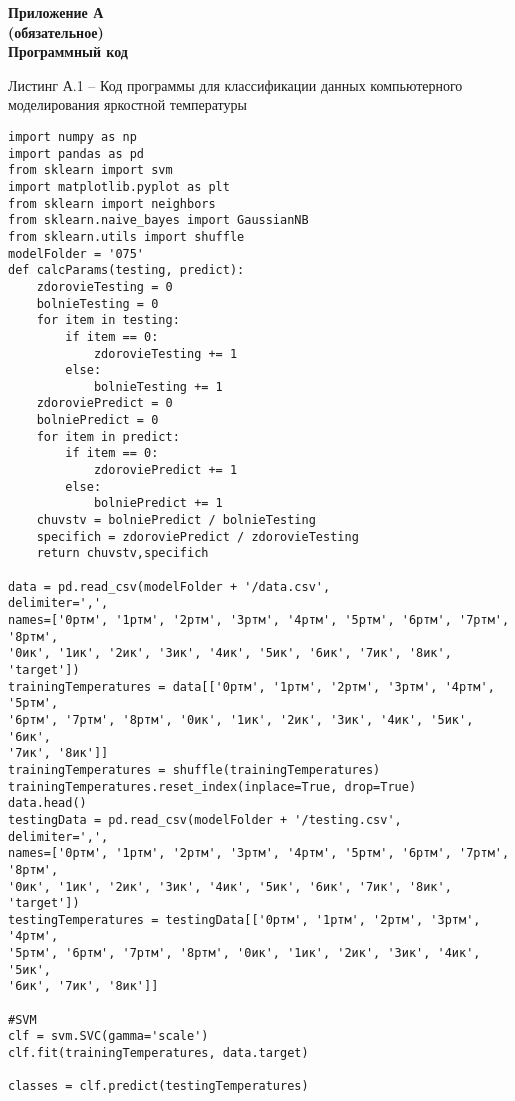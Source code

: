 \newpage
{} 
\begin{center} 
    \textbf{Приложение А}
    \\
    \textbf{(обязательное)}
    \\
    \textbf{Программный код}
\end{center} 
\vspace{8mm}
\par
Листинг А.1 -- Код программы для классификации данных компьютерного моделирования яркостной температуры
\vspace{8mm}
\large
\begin{verbatim}
import numpy as np
import pandas as pd
from sklearn import svm
import matplotlib.pyplot as plt
from sklearn import neighbors
from sklearn.naive_bayes import GaussianNB
from sklearn.utils import shuffle
modelFolder = '075'
def calcParams(testing, predict):
    zdorovieTesting = 0
    bolnieTesting = 0
    for item in testing:    
        if item == 0:
            zdorovieTesting += 1
        else:
            bolnieTesting += 1
    zdoroviePredict = 0
    bolniePredict = 0
    for item in predict:    
        if item == 0:
            zdoroviePredict += 1
        else:
            bolniePredict += 1	
	chuvstv = bolniePredict / bolnieTesting
	specifich = zdoroviePredict / zdorovieTesting
	return chuvstv,specifich
	
data = pd.read_csv(modelFolder + '/data.csv', 
delimiter=',', 
names=['0ртм', '1ртм', '2ртм', '3ртм', '4ртм', '5ртм', '6ртм', '7ртм', '8ртм', 
'0ик', '1ик', '2ик', '3ик', '4ик', '5ик', '6ик', '7ик', '8ик', 'target'])
trainingTemperatures = data[['0ртм', '1ртм', '2ртм', '3ртм', '4ртм', '5ртм', 
'6ртм', '7ртм', '8ртм', '0ик', '1ик', '2ик', '3ик', '4ик', '5ик', '6ик',
'7ик', '8ик']]
trainingTemperatures = shuffle(trainingTemperatures)
trainingTemperatures.reset_index(inplace=True, drop=True)
data.head()
testingData = pd.read_csv(modelFolder + '/testing.csv', 
delimiter=',', 
names=['0ртм', '1ртм', '2ртм', '3ртм', '4ртм', '5ртм', '6ртм', '7ртм', '8ртм', 
'0ик', '1ик', '2ик', '3ик', '4ик', '5ик', '6ик', '7ик', '8ик', 'target'])
testingTemperatures = testingData[['0ртм', '1ртм', '2ртм', '3ртм', '4ртм',
'5ртм', '6ртм', '7ртм', '8ртм', '0ик', '1ик', '2ик', '3ик', '4ик', '5ик',
'6ик', '7ик', '8ик']]

#SVM
clf = svm.SVC(gamma='scale')
clf.fit(trainingTemperatures, data.target)

classes = clf.predict(testingTemperatures)


\end{verbatim}
